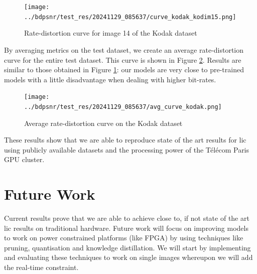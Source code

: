 \begin{figure}
    \centering
    \texttt{[image: ../bdpsnr/test\_res/20241129\_085637/curve\_kodak\_kodim15.png]}
    \caption{Rate-distortion curve for image 14 of the Kodak dataset}
    \label{bdpsnr_3}
\end{figure}

By averaging metrics on the test dataset, we create an average rate-distortion curve for the entire test dataset. This curve is shown in Figure \ref{bdpsnr_4}. Results are similar to those obtained in Figure \ref{bdpsnr_3}: our models are very close to pre-trained models with a little disadvantage when dealing with higher bit-rates.

\begin{figure}
    \centering
    \texttt{[image: ../bdpsnr/test\_res/20241129\_085637/avg\_curve\_kodak.png]}
    \caption{Average rate-distortion curve on the Kodak dataset}
    \label{bdpsnr_4}
\end{figure}

These results show that we are able to reproduce state of the art results for \acrshort{lic} using publicly available datasets and the processing power of the Télécom Paris GPU cluster.

\section{Future Work}
Current results prove that we are able to achieve close to, if not state of the art \acrshort{lic} results on traditional hardware. Future work will focus on improving models to work on power constrained platforms (like FPGA) by using techniques like pruning, quantisation and knowledge distillation. We will start by implementing and evaluating these techniques to work on single images whereupon we will add the real-time constraint.